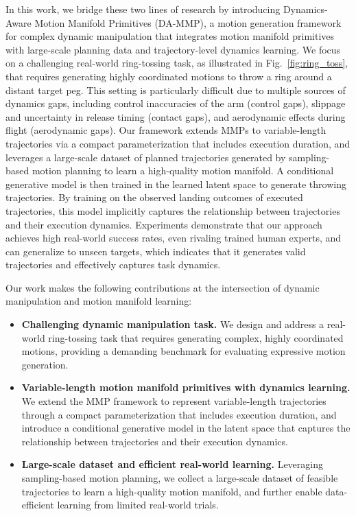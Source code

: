 \documentclass[letterpaper, 10 pt, conference]{ieeeconf}  %
\begin{document}
In this work, we bridge these two lines of research by introducing Dynamics-Aware Motion Manifold Primitives (DA-MMP), a motion generation framework for complex dynamic manipulation that integrates motion manifold primitives with large-scale planning data and trajectory-level dynamics learning.
We focus on a challenging real-world ring-tossing task, as illustrated in Fig.~\ref{fig:ring_toss}, that requires generating highly coordinated motions to throw a ring around a distant target peg.
This setting is particularly difficult due to multiple sources of dynamics gaps, including control inaccuracies of the arm (control gaps), slippage and uncertainty in release timing (contact gaps), and aerodynamic effects during flight (aerodynamic gaps).
Our framework extends MMPs to variable-length trajectories via a compact parameterization that includes execution duration, and leverages a large-scale dataset of planned trajectories generated by sampling-based motion planning to learn a high-quality motion manifold.
A conditional generative model is then trained in the learned latent space to generate throwing trajectories. 
By training on the observed landing outcomes of executed trajectories, this model implicitly captures the relationship between trajectories and their execution dynamics.
Experiments demonstrate that our approach achieves high real-world success rates, even rivaling trained human experts, and can generalize to unseen targets, which indicates that it generates valid trajectories and effectively captures task dynamics.

Our work makes the following contributions at the intersection of dynamic manipulation and motion manifold learning:%
\begin{itemize}
    \item \textbf{Challenging dynamic manipulation task.} We design and address a real-world ring-tossing task that requires generating complex, highly coordinated motions, providing a demanding benchmark for evaluating expressive motion generation.
    \item \textbf{Variable-length motion manifold primitives with dynamics learning.} We extend the MMP framework to represent variable-length trajectories through a compact parameterization that includes execution duration, and introduce a conditional generative model in the latent space that captures the relationship between trajectories and their execution dynamics. 
    \item \textbf{Large-scale dataset and efficient real-world learning.} Leveraging sampling-based motion planning, we collect a large-scale dataset of feasible trajectories to learn a high-quality motion manifold, and further enable data-efficient learning from limited real-world trials.
\end{itemize}
\end{document}
